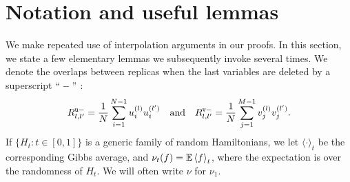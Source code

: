\documentclass[final,12pt]{colt2018} %
\newcommand{\utt}{\textup{\texttt{u}}}
\newcommand{\vtt}{\textup{\texttt{v}}}
\begin{document}
\section{Notation and useful lemmas}
\label{sxn:preliminaries}
We make repeated use of interpolation arguments in our proofs. In this section, we state a few elementary lemmas we subsequently invoke several times. We denote the overlaps between replicas when the last variables are deleted by a superscript $``-"$ :
\[R_{l,l'}^{\utt -} = \frac{1}{N}\sum_{i=1}^{N-1}u^{(l)}_iu^{(l')}_i ~~~\mbox{and}~~~ R_{l,l'}^{\vtt -} = \frac{1}{N}\sum_{j=1}^{M-1}v^{(l)}_jv^{(l')}_j.\]
If $\{H_t: t \in [0,1]\}$ is a generic family of random Hamiltonians, we let $\langle \cdot \rangle_t$ be the corresponding Gibbs average, and $\nu_t(f) =\operatorname{\mathbb{E}}\left \langle f\right \rangle_t$, where the expectation is over the randomness of $H_t$. We will often write $\nu$ for $\nu_1$.
\end{document}
